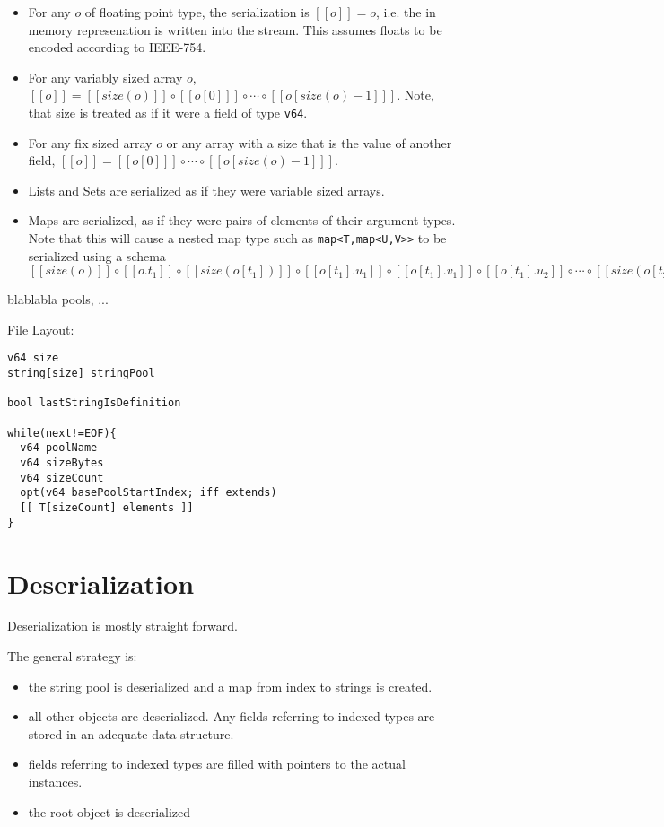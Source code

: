 \documentclass[a4paper,10pt]{article}
\newcommand{\den}[1]{[\![#1]\!]}
\begin{document}
\begin{itemize}
 \item For any $o$ of floating point type, the serialization is $\den{o} = o$, i.e. the in memory represenation is written into the stream. This assumes floats to be encoded according to IEEE-754.
 
 \item For any variably sized array $o$, $\den{o} = \den{size(o)} \circ \den{o[0]} \circ \cdots \circ \den{o[size(o)-1]}$. Note, that size is treated as if it were a field of type \texttt{v64}.
 \item For any fix sized array $o$ or any array with a size that is the value of another field, $\den{o} = \den{o[0]} \circ \cdots \circ \den{o[size(o)-1]}$.
 
 \item Lists and Sets are serialized as if they were variable sized arrays.
 
 \item Maps are serialized, as if they were pairs of elements of their argument types. Note that this will cause a nested map type such as \verb/map<T,map<U,V>>/ to be serialized using a schema $ \den{size(o)} \circ \den{o.t_1} \circ \den{size(o[t_1])} \circ \den{o[t_1].u_1} \circ \den{o[t_1].v_1} \circ \den{o[t_1].u_2} \circ \cdots \circ \den{size(o[t_2])} \circ \cdots \circ \den{o[t_n].v_m}$
\end{itemize}
 
blablabla pools, ...

File Layout:

\begin{verbatim}
v64 size
string[size] stringPool

bool lastStringIsDefinition

while(next!=EOF){
  v64 poolName
  v64 sizeBytes
  v64 sizeCount
  opt(v64 basePoolStartIndex; iff extends)
  [[ T[sizeCount] elements ]]
}
\end{verbatim}

\section{Deserialization}

Deserialization is mostly straight forward.

The general strategy is:
\begin{itemize}
 \item the string pool is deserialized and a map from index to strings is created.
 \item all other objects are deserialized. Any fields referring to indexed types are stored in an adequate data structure.
 \item fields referring to indexed types are filled with pointers to the actual instances.
 \item the root object is deserialized
\end{itemize}
\end{document}
